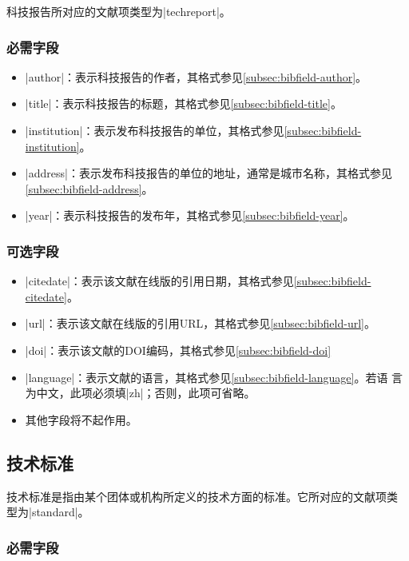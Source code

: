 科技报告所对应的{\BibTeX}文献项类型为|techreport|。

\subsubsection{必需字段}

\begin{itemize}
\item |author|：表示科技报告的作者，其格式参见\ref{subsec:bibfield-author}。
\item |title|：表示科技报告的标题，其格式参见\ref{subsec:bibfield-title}。
\item |institution|：表示发布科技报告的单位，其格式参见\ref{subsec:bibfield-institution}。
\item |address|：表示发布科技报告的单位的地址，通常是城市名称，其格式参见
  \ref{subsec:bibfield-address}。
\item |year|：表示科技报告的发布年，其格式参见\ref{subsec:bibfield-year}。
\end{itemize}

\subsubsection{可选字段}

\begin{itemize}
\item |citedate|：表示该文献在线版的引用日期，其格式参见\ref{subsec:bibfield-citedate}。
\item |url|：表示该文献在线版的引用URL，其格式参见\ref{subsec:bibfield-url}。
\item |doi|：表示该文献的DOI编码，其格式参见\ref{subsec:bibfield-doi}
\item |language|：表示文献的语言，其格式参见\ref{subsec:bibfield-language}。若语
  言为中文，此项必须填|zh|；否则，此项可省略。
\item 其他字段将不起作用。
\end{itemize}

\subsection{技术标准}\label{subsec:bibtype-standard}

技术标准是指由某个团体或机构所定义的技术方面的标准。它所对应的{\BibTeX}文献项类
型为|standard|。

\subsubsection{必需字段}

